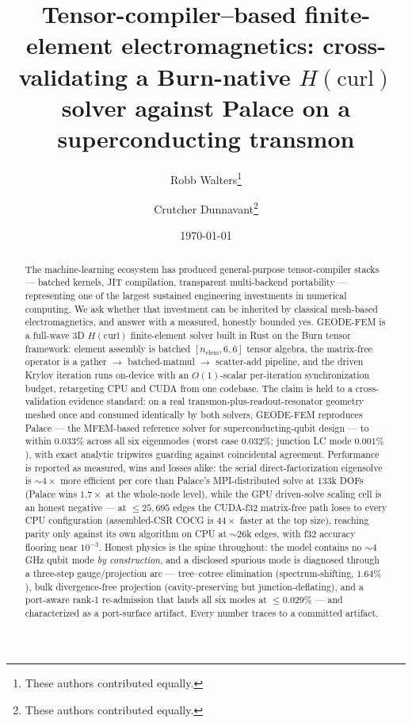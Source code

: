 \documentclass{anvil-paper}
\title{Tensor-compiler--based finite-element electromagnetics:
cross-validating a Burn-native $H(\mathrm{curl})$ solver against Palace on
a superconducting transmon}
\author{Robb Walters\thanks{These authors contributed equally.}
  \and Crutcher Dunnavant\thanks{These authors contributed equally.}}
\date{\today}
\begin{document}
\maketitle

\begin{abstract}
The machine-learning ecosystem has produced general-purpose tensor-compiler
stacks --- batched kernels, JIT compilation, transparent multi-backend
portability --- representing one of the largest sustained engineering
investments in numerical computing. We ask whether that investment can be
inherited by classical mesh-based electromagnetics, and answer with a
measured, honestly bounded yes. GEODE-FEM is a full-wave 3D
$H(\mathrm{curl})$ finite-element solver built in Rust on the Burn tensor
framework: element assembly is batched $[n_{\mathrm{elem}},6,6]$ tensor
algebra, the matrix-free operator is a gather $\to$ batched-matmul $\to$
scatter-add pipeline, and the driven Krylov iteration runs on-device with an
$O(1)$-scalar per-iteration synchronization budget, retargeting CPU and CUDA
from one codebase. The claim is held to a cross-validation evidence
standard: on a real transmon-plus-readout-resonator geometry meshed once and
consumed identically by both solvers, GEODE-FEM reproduces Palace --- the
MFEM-based reference solver for superconducting-qubit design --- to within
$0.033\%$ across all six eigenmodes (worst case $0.032\%$; junction LC mode
$0.001\%$), with exact analytic tripwires guarding against coincidental
agreement. Performance is reported as measured, wins and losses alike: the
serial direct-factorization eigensolve is ${\sim}4\times$ more efficient per
core than Palace's MPI-distributed solve at 133k DOFs (Palace wins
$1.7\times$ at the whole-node level), while the GPU driven-solve scaling
cell is an honest negative --- at $\leq 25{,}695$ edges the CUDA-f32
matrix-free path loses to every CPU configuration (assembled-CSR COCG is
$44\times$ faster at the top size), reaching parity only against its own
algorithm on CPU at ${\sim}26$k edges, with f32 accuracy flooring near
$10^{-3}$. Honest physics is the spine throughout: the model contains no
${\sim}4$\,GHz qubit mode \emph{by construction}, and a disclosed spurious
mode is diagnosed through a three-step gauge/projection arc --- tree--cotree
elimination (spectrum-shifting, $1.64\%$), bulk divergence-free projection
(cavity-preserving but junction-deflating), and a port-aware rank-1
re-admission that lands all six modes at $\leq 0.029\%$ --- and characterized
as a port-surface artifact. Every number traces to a committed artifact.
\end{abstract}
\end{document}

